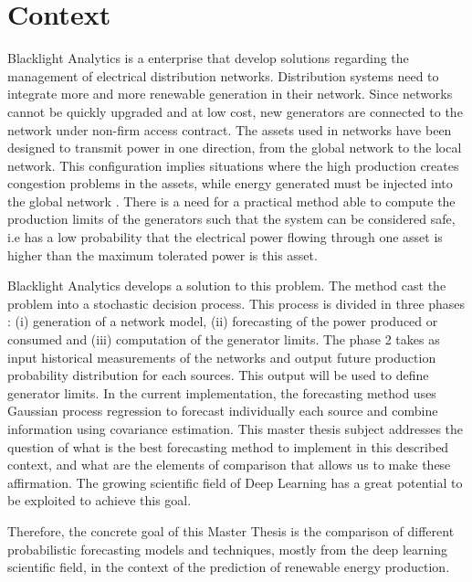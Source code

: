 \documentclass[a4paper, 12pt]{article}
\begin{document}
\newpage


\section{Context} \label{intro}

Blacklight Analytics is a enterprise that develop solutions regarding the management of electrical distribution networks. 
Distribution systems
need to integrate more and more renewable generation in their network. Since networks cannot be quickly upgraded and at low cost, new generators are connected to the network under non-firm access contract. The assets used in networks have been designed to transmit power in one direction, from the global network to the local network. This configuration implies situations where the high production creates congestion problems in the assets, while energy generated must be injected into the global network . There is
a need for a practical method able to compute the production limits of the generators such that the system can be considered safe, i.e has a low probability that the electrical power flowing through one asset is higher than the maximum tolerated power is this asset.


Blacklight Analytics develops a solution to 
this problem. The method cast the problem into a stochastic decision process. This process is divided in three phases : (i) generation of a network model, (ii) forecasting of the power produced or consumed and (iii) computation of the generator limits. The phase 2 takes as input historical measurements of the networks and output future production probability distribution for each sources. This output will be used to define generator limits.
In the current implementation, the forecasting method uses Gaussian process regression to forecast individually each source and combine information using covariance estimation. 
This master thesis subject addresses the question of what is the best forecasting method to implement in this described context, and what are the elements of comparison that allows us to make these affirmation. The growing scientific field of Deep Learning has a great potential to be exploited to achieve this goal. 



Therefore, the concrete goal of this Master Thesis is the comparison of different probabilistic forecasting models and techniques, mostly from the deep learning scientific field,
in the context of the prediction of renewable energy production.
\end{document}
